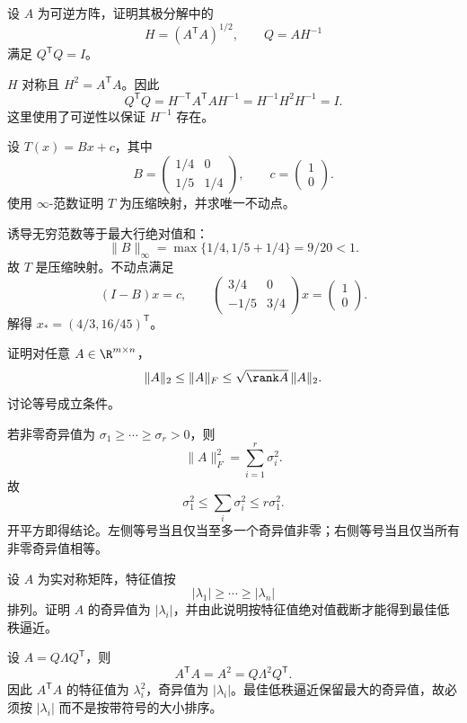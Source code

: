 \begin{exercise}[level=standard]
设 $A$ 为可逆方阵，证明其极分解中的
\[
H=(A^{\mathsf T}A)^{1/2},
\qquad Q=AH^{-1}
\]
满足 $Q^{\mathsf T}Q=I$。
\begin{solution}
$H$ 对称且 $H^2=A^{\mathsf T}A$。因此
\[
Q^{\mathsf T}Q
=H^{-\mathsf T}A^{\mathsf T}AH^{-1}
=H^{-1}H^2H^{-1}=I.
\]
这里使用了可逆性以保证 $H^{-1}$ 存在。
\end{solution}
\end{exercise}

\begin{exercise}[level=standard]
设 $T(x)=Bx+c$，其中
\[
B=\begin{pmatrix}1/4&0\\1/5&1/4\end{pmatrix},
\qquad c=\begin{pmatrix}1\\0\end{pmatrix}.
\]
使用 $\infty$-范数证明 $T$ 为压缩映射，并求唯一不动点。
\begin{solution}
诱导无穷范数等于最大行绝对值和：
\[
\lVert B\rVert_\infty=\max\{1/4,1/5+1/4\}=9/20<1.
\]
故 $T$ 是压缩映射。不动点满足
\[
(I-B)x=c,
\qquad
\begin{pmatrix}3/4&0\\-1/5&3/4\end{pmatrix}x
=\begin{pmatrix}1\\0\end{pmatrix}.
\]
解得 $x_*=(4/3,16/45)^{\mathsf T}$。
\end{solution}
\end{exercise}

\begin{exercise}[level=advanced]
证明对任意 $A\in\R^{m\times n}$，
\[
\lVert A\rVert_2\le\lVert A\rVert_F
\le\sqrt{\rank A}\,\lVert A\rVert_2.
\]
讨论等号成立条件。
\begin{solution}
若非零奇异值为 $\sigma_1\ge\cdots\ge\sigma_r>0$，则
\[
\lVert A\rVert_F^2=\sum_{i=1}^r\sigma_i^2.
\]
故
\[
\sigma_1^2\le\sum_i\sigma_i^2\le r\sigma_1^2.
\]
开平方即得结论。左侧等号当且仅当至多一个奇异值非零；右侧等号当且仅当所有非零奇异值相等。
\end{solution}
\end{exercise}

\begin{exercise}[level=advanced]
设 $A$ 为实对称矩阵，特征值按
\[
|\lambda_1|\ge\cdots\ge|\lambda_n|
\]
排列。证明 $A$ 的奇异值为 $|\lambda_i|$，并由此说明按特征值绝对值截断才能得到最佳低秩逼近。
\begin{solution}
设 $A=Q\Lambda Q^{\mathsf T}$，则
\[
A^{\mathsf T}A=A^2=Q\Lambda^2Q^{\mathsf T}.
\]
因此 $A^{\mathsf T}A$ 的特征值为 $\lambda_i^2$，奇异值为 $|\lambda_i|$。最佳低秩逼近保留最大的奇异值，故必须按 $|\lambda_i|$ 而不是按带符号的大小排序。
\end{solution}
\end{exercise}

